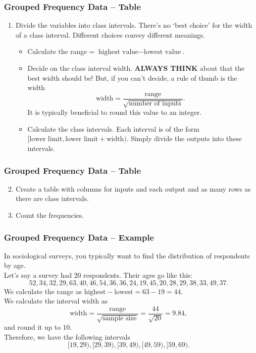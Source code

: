 \documentclass[aspectratio=169,11pt,svgnames]{beamer}
\begin{document}
\begin{frame}
 \frametitle{Grouped Frequency Data -- Table}
 \begin{enumerate}
  \item Divide the variables into \alert{class intervals}. There's no `best
   choice' for the width of a class interval. Different choices convey different
   meanings.
   \pause
   \begin{itemize}
    \item Calculate the \alert{range} = $\text{highest value} - \text{lowest
     value}$.
    \pause
    \item Decide on the \alert{class interval width}. \textbf{ALWAYS THINK}
     about that the best width should be! But, if you can't decide, a rule of
     thumb is the width
     \[
      \text{width} = \frac{\text{range}}{\sqrt{\text{number of inputs}}}.
     \]
     It is typically beneficial to round this value to an integer.
    \pause
    \item Calculate the \alert{class intervals}. Each interval is of the form
     $[\text{lower limit}, \text{lower limit} + \text{width})$. Simply divide
     the outputs into these intervals.
   \end{itemize}
 \end{enumerate}
\end{frame}

\begin{frame}
 \frametitle{Grouped Frequency Data -- Table}
 \begin{enumerate}
  \setcounter{enumi}{1}
  \item Create a \alert{table} with columns for inputs and each output and as
   many rows as there are class intervals.
  \pause
  \item Count the \alert{frequencies}.
 \end{enumerate}
\end{frame}

\begin{frame}
 \frametitle{Grouped Frequency Data -- Example}
 In sociological surveys, you typically want to find the distribution of
 respondents by age.\\
 \pause
 Let's say a survey had 20 respondents. Their ages go like this:
 \[
  52, 34, 32, 29, 63, 40, 46, 54, 36, 36, 24, 19, 45, 20, 28, 29, 38, 33, 49,
  37.
 \]
 \pause
 We calculate the range as $\text{highest} - \text{lowest} = 63 - 19 = 44$.\\
 We calculate the interval width as
 \[
  \text{width} = \frac{\text{range}}{\sqrt{\text{sample size}}} =
  \frac{44}{\sqrt{20}} = 9.84,
 \]
 and round it up to $10$.\\
 \pause
 Therefore, we have the following intervals
 \[
  [19, 29), [29, 39), [39, 49), [49, 59), [59, 69).
 \]
\end{frame}
\end{document}
